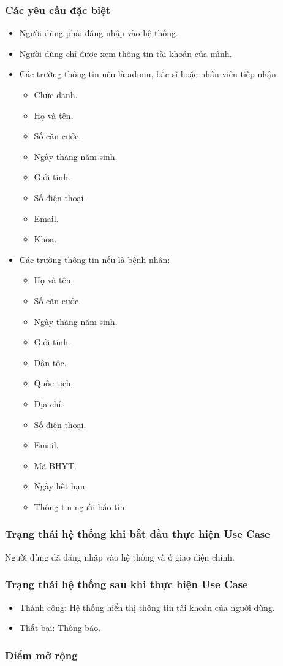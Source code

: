 \subsubsection{Các yêu cầu đặc biệt}
\begin{itemize}
    \item Người dùng phải đăng nhập vào hệ thống.
    \item Người dùng chỉ được xem thông tin tài khoản của mình.
    \item Các trường thông tin nếu là admin, bác sĩ hoặc nhân viên tiếp nhận:
    \begin{itemize}
        \item Chức danh.
        \item Họ và tên.
        \item Số căn cước.
        \item Ngày tháng năm sinh.
        \item Giới tính.
        \item Số điện thoại.
        \item Email.
        \item Khoa.
    \end{itemize}
    \item Các trường thông tin nếu là bệnh nhân:
    \begin{itemize}
        \item Họ và tên.
        \item Số căn cước.
        \item Ngày tháng năm sinh.
        \item Giới tính.
        \item Dân tộc.
        \item Quốc tịch.
        \item Địa chỉ.
        \item Số điện thoại.
        \item Email.
        \item Mã BHYT.
        \item Ngày hết hạn.
        \item Thông tin người báo tin.
    \end{itemize}
\end{itemize}

\subsubsection{Trạng thái hệ thống khi bắt đầu thực hiện Use Case}
Người dùng đã đăng nhập vào hệ thống và ở giao diện chính.

\subsubsection{Trạng thái hệ thống sau khi thực hiện Use Case}
\begin{itemize}
    \item Thành công: Hệ thống hiển thị thông tin tài khoản của người dùng.
    \item Thất bại: Thông báo.
\end{itemize}

\subsubsection{Điểm mở rộng}